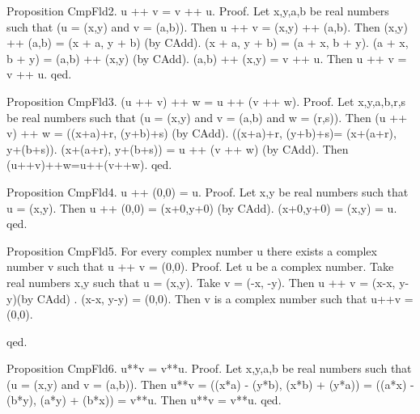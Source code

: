 \documentclass{article}
\newenvironment{forthel}{\begin{leftbar}}{\end{leftbar}}
\begin{document}
\begin{forthel}
Proposition CmpFld2.  u ++ v = v ++ u.
Proof. Let x,y,a,b be real numbers such that (u = (x,y) and v = (a,b)).
Then u ++ v = (x,y) ++ (a,b).
Then (x,y) ++ (a,b) = (x + a, y + b) (by CAdd).	
(x + a, y + b) = (a + x, b + y). 
(a + x, b + y) = (a,b) ++ (x,y) (by CAdd).
(a,b) ++ (x,y) = v ++ u. 
Then u ++ v = v ++ u.
qed. 



Proposition CmpFld3. (u ++ v) ++ w = u ++ (v ++ w).
Proof. Let x,y,a,b,r,s be real numbers such that (u = (x,y) and v = (a,b) and w = (r,s)).
Then (u ++ v) ++ w = ((x+a)+r, (y+b)+s) (by CAdd). 
((x+a)+r, (y+b)+s)= (x+(a+r), y+(b+s)).
(x+(a+r), y+(b+s)) = u ++ (v ++ w) (by CAdd).
Then (u++v)++w=u++(v++w). 
qed.

Proposition CmpFld4. u ++ (0,0) = u.
Proof. 
Let x,y be real numbers such that u = (x,y). Then u ++ (0,0) = (x+0,y+0) (by CAdd). (x+0,y+0) = (x,y) = u. 
qed.



Proposition CmpFld5. For every complex number u there exists a complex number v such that u ++ v = (0,0).
Proof. Let u be a complex number.
Take real numbers x,y such that u = (x,y). Take v = (-x, -y). Then  u ++ v = (x-x, y-y)(by CAdd) . (x-x, y-y) = (0,0). 
Then v is a complex number such that u++v = (0,0).

qed.

Proposition CmpFld6. u**v = v**u.
Proof. Let x,y,a,b be real numbers such that (u = (x,y) and v = (a,b)).
Then u**v =  ((x*a) - (y*b), (x*b) + (y*a)) =  ((a*x) - (b*y), (a*y) + (b*x)) = v**u. Then u**v = v**u. qed.


\end{forthel}
\end{document}
